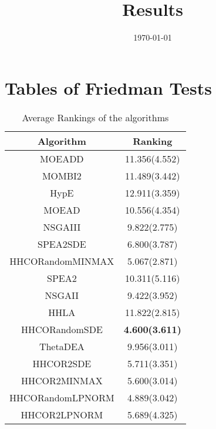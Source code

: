 \documentclass{article}
\title{Results}
\author{}
\date{\today}
\begin{document}
\oddsidemargin 0in \topmargin 0in\maketitle
\section{Tables of Friedman Tests}
\begin{table}[!htp]
\centering
\caption{Average Rankings of the algorithms
}\begin{tabular}{|c|c|}
\hline
Algorithm&Ranking\\
\hline
MOEADD&11.356(4.552)\\\hline
MOMBI2&11.489(3.442)\\\hline
HypE&12.911(3.359)\\\hline
MOEAD&10.556(4.354)\\\hline
NSGAIII&9.822(2.775)\\\hline
SPEA2SDE&6.800(3.787)\\\hline
HHCORandomMINMAX&5.067(2.871)\\\hline
SPEA2&10.311(5.116)\\\hline
NSGAII&9.422(3.952)\\\hline
HHLA&11.822(2.815)\\\hline
HHCORandomSDE& {\bf 4.600(3.611)}\\\hline
ThetaDEA&9.956(3.011)\\\hline
HHCOR2SDE&5.711(3.351)\\\hline
HHCOR2MINMAX&5.600(3.014)\\\hline
HHCORandomLPNORM&4.889(3.042)\\\hline
HHCOR2LPNORM&5.689(4.325)\\\hline
\end{tabular}
\end{table}
\end{document}
